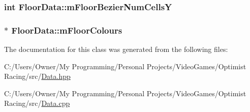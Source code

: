 \hypertarget{class_floor_data_a79cc90d0b076ef2a7204d3f16480f1d5}{
\subsubsection[{m\-Floor\-Bezier\-Num\-Cells\-Y}]{\setlength{\rightskip}{0pt plus 5cm}int Floor\-Data\-::m\-Floor\-Bezier\-Num\-Cells\-Y}}\label{class_floor_data_a79cc90d0b076ef2a7204d3f16480f1d5}
\hypertarget{class_floor_data_aaf030f1c62c18bde64f0dbf3f6d08242}{
\subsubsection[{m\-Floor\-Colours}]{$\ast$ Floor\-Data\-::m\-Floor\-Colours}}\label{class_floor_data_aaf030f1c62c18bde64f0dbf3f6d08242}


The documentation for this class was generated from the following files\-:\begin{DoxyCompactItemize}
\item 
C\-:/\-Users/\-Owner/\-My Programming/\-Personal Projects/\-Video\-Games/\-Optimist Racing/src/\hyperlink{_data_8hpp}{Data.\-hpp}\item 
C\-:/\-Users/\-Owner/\-My Programming/\-Personal Projects/\-Video\-Games/\-Optimist Racing/src/\hyperlink{_data_8cpp}{Data.\-cpp}\end{DoxyCompactItemize}
